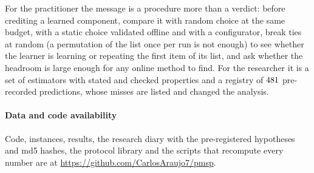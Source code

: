 For the practitioner the message is a procedure more than a verdict: before crediting a learned component, compare it with random choice at the same budget, with a static choice validated offline and with a configurator, break ties at random (a permutation of the list once per run is not enough) to see whether the learner is learning or repeating the first item of its list, and ask whether the headroom is large enough for any online method to find. For the researcher it is a set of estimators with stated and checked properties and a registry of $481$ pre-recorded predictions, whose misses are listed and changed the analysis.

\paragraph{Data and code availability} Code, instances, results, the research diary with the pre-registered hypotheses and md5 hashes, the protocol library and the scripts that recompute every number are at \url{https://github.com/CarlosAraujo7/pmsp}. 
